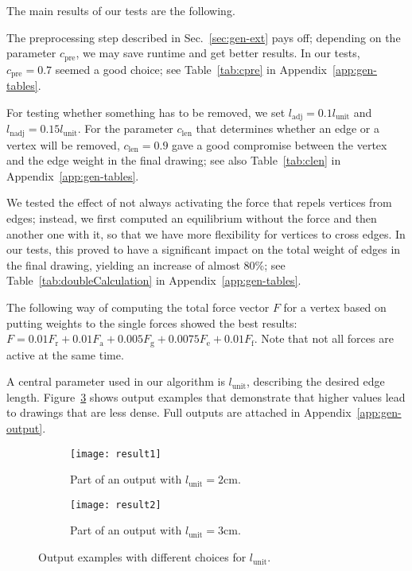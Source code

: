 \documentclass[]{llncs}
\newcommand{\lunit}{\ensuremath{l_\mathrm{unit}}\xspace}
\newcommand{\frep}{\ensuremath{F_\mathrm{r}}\xspace}
\newcommand{\fatt}{\ensuremath{F_\mathrm{a}}\xspace}
\newcommand{\fedge}{\ensuremath{F_\mathrm{e}}\xspace}
\newcommand{\fgrav}{\ensuremath{F_\mathrm{g}}\xspace}
\newcommand{\ladj}{\ensuremath{l_\mathrm{adj}}\xspace}
\newcommand{\lnadj}{\ensuremath{l_\mathrm{nadj}}\xspace}
\newcommand{\fframe}{\ensuremath{F_\mathrm{f}}\xspace}
\newcommand{\clen}{\ensuremath{c_\mathrm{len}}\xspace}
\newcommand{\cpre}{\ensuremath{c_\mathrm{pre}}\xspace}
\begin{document}
The main results of our tests are the following.
\begin{compactitem}
  \item The preprocessing step described in Sec.~\ref{sec:gen-ext}
    pays off; depending on the parameter \cpre, we may save
    runtime and get better results. In our tests, $\cpre = 0.7$ seemed
		a good choice; see Table~\ref{tab:cpre} in
		Appendix~\ref{app:gen-tables}.


\item For testing whether something has to be removed, we set
    $\ladj = 0.1 \lunit$ and $\lnadj = 0.15 \lunit$. For the parameter
    $\clen$ that determines whether an edge or a vertex will be
    removed, $\clen = 0.9$ gave a good compromise between
    the vertex and the edge weight in the final drawing; see also
		Table~\ref{tab:clen} in Appendix~\ref{app:gen-tables}.
  \item We tested the effect of not always activating the force that repels
    vertices from edges; instead, we first computed an
    equilibrium without the force and then another one with it, so
    that we have more flexibility for vertices to cross edges. In our
    tests, this proved to have a significant impact on the total
    weight of edges in the final drawing, yielding an increase of
    almost 80\%; see Table~\ref{tab:doubleCalculation} in
		Appendix~\ref{app:gen-tables}.

  \item The following way of computing the total force
    vector $F$ for a vertex based on putting weights to the single
    forces showed the best results: $F = 0.01 \frep + 0.01 \fatt +
    0.005 \fgrav + 0.0075 \fedge + 0.01 \fframe$. Note that not
    all forces are active at the same time.
\end{compactitem}

A central parameter used in our algorithm is \lunit, describing the
desired edge length. Figure~\ref{fig:gen-results-examples-crop} shows
output examples that demonstrate that higher values lead to
drawings that are less dense. Full outputs are attached in
Appendix~\ref{app:gen-output}.

\begin{figure}[tb]
  \begin{subfigure}[t]{.49\textwidth}
    \centering
    \texttt{[image: result1]}
    \caption{Part of an output with $\lunit = 2$cm.}
    \label{fig:gen-result1-crop}
  \end{subfigure}
  \hfill
  \begin{subfigure}[t]{.49\textwidth}
    \centering
    \texttt{[image: result2]}
    \caption{Part of an output with $\lunit = 3$cm.}
    \label{fig:gen-result2-crop}
  \end{subfigure}
  \caption{Output examples with different choices for \lunit.}
  \label{fig:gen-results-examples-crop}
\end{figure}
\end{document}
